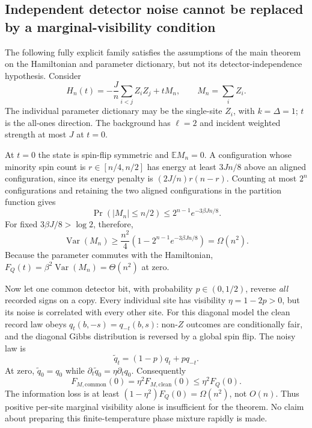 \documentclass[11pt,a4paper]{article}
\theoremstyle{remark}
\newcommand{\Var}{\operatorname{Var}}
\newcommand{\E}{\mathbb E}
\begin{document}
\subsection{Independent detector noise cannot be replaced by a marginal-visibility condition}
The following fully explicit family satisfies the assumptions of the main theorem on the Hamiltonian and parameter dictionary, but not its detector-independence hypothesis. Consider
\begin{equation}
 H_n(t)=-\frac Jn\sum_{i<j}Z_iZ_j+tM_n,
 \qquad M_n=\sum_i Z_i.
 \label{eq:CW}
\end{equation}
The individual parameter dictionary may be the single-site $Z_i$, with $k=\Delta=1$; $t$ is the all-ones direction. The background has $\ell=2$ and incident weighted strength at most $J$ at $t=0$.

At $t=0$ the state is spin-flip symmetric and $\E M_n=0$. A configuration whose minority spin count is $r\in[n/4,n/2]$ has energy at least $3Jn/8$ above an aligned configuration, since its energy penalty is $(2J/n)r(n-r)$. Counting at most $2^n$ configurations and retaining the two aligned configurations in the partition function gives
\[
 \Pr(|M_n|\le n/2)\le2^{n-1}e^{-3\beta Jn/8}.
\]
For fixed $3\beta J/8>\log2$, therefore,
\begin{equation}
 \Var(M_n)\ge\frac{n^2}{4}\left(1-2^{n-1}e^{-3\beta Jn/8}\right)
 =\Omega(n^2).
 \label{eq:macroscopic}
\end{equation}
Because the parameter commutes with the Hamiltonian, $F_Q(t)=\beta^2\Var(M_n)=\Theta(n^2)$ at zero.

Now let one common detector bit, with probability $p\in(0,1/2)$, reverse \emph{all} recorded signs on a copy. Every individual site has visibility $\eta=1-2p>0$, but its noise is correlated with every other site. For this diagonal model the clean record law obeys $q_t(b,-s)=q_{-t}(b,s)$: non-$Z$ outcomes are conditionally fair, and the diagonal Gibbs distribution is reversed by a global spin flip. The noisy law is
\[
 \widetilde q_t=(1-p)q_t+p q_{-t}.
\]
At zero, $\widetilde q_0=q_0$ while $\partial_t\widetilde q_0=\eta\partial_tq_0$. Consequently
\begin{equation}
 F_{M,\mathrm{common}}(0)=\eta^2F_{M,\mathrm{clean}}(0)
 \le\eta^2F_Q(0).
\end{equation}
The information loss is at least $(1-\eta^2)F_Q(0)=\Omega(n^2)$, not $O(n)$. Thus positive per-site marginal visibility alone is insufficient for the theorem. No claim about preparing this finite-temperature phase mixture rapidly is made.
\end{document}
